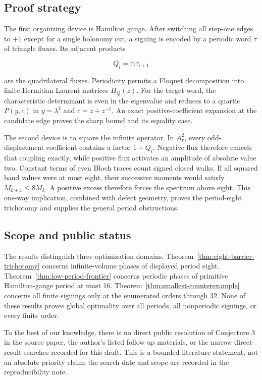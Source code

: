\subsection{Proof strategy}

The first organizing device is Hamilton gauge. After switching all step-one
edges to \(+1\) except for a single holonomy cut, a signing is encoded by a
periodic word \(\tau\) of triangle fluxes. Its adjacent products

\begin{equation}
Q_i=\tau_i \tau_{i+1}
\end{equation}

are the quadrilateral fluxes. Periodicity permits a Floquet decomposition into
finite Hermitian Laurent matrices \(H_Q(z)\). For the target word, the
characteristic determinant is even in the eigenvalue and reduces to a quartic
\(P(y,c)\) in \(y=\lambda^{2}\) and \(c=z+z^{-1}\). An exact positive-coefficient
expansion at the candidate edge proves the sharp bound and its equality case.

The second device is to square the infinite operator. In \(A_\tau^{2}\), every
odd-displacement coefficient contains a factor \(1+Q_i\). Negative flux
therefore cancels that coupling exactly, while positive flux activates an
amplitude of absolute value two. Constant terms of even Bloch traces count
signed closed walks. If all squared band values were at most eight, their
successive moments would satisfy \(M_{k+1}\leq 8M_k\). A positive excess therefore
forces the spectrum above eight. This one-way implication, combined with
defect geometry, proves the period-eight trichotomy and supplies the general
period obstructions.

\subsection{Scope and public status}

The results distinguish three optimization domains. Theorem~\ref{thm:eight-barrier-trichotomy} concerns
infinite-volume phases of displayed period eight. Theorem~\ref{thm:low-period-frontier} concerns periodic
phases of primitive Hamilton-gauge period at most 16. Theorem~\ref{thm:smallest-counterexample} concerns all
finite signings only at the enumerated orders through 32. None of these results
proves global optimality over all periods, all nonperiodic signings, or every
finite order.

To the best of our knowledge, there is no direct public resolution of Conjecture 3 in
the source paper, the author's listed follow-up materials, or the narrow
direct-result searches recorded for this draft. This is a bounded literature statement, not an absolute priority claim; the search date and scope are recorded in the reproducibility note.

